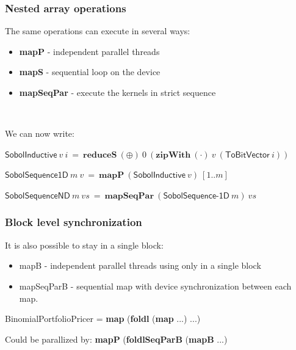 \documentclass{beamer}
\begin{document}

\begin{frame}
  \frametitle{Nested array operations}

  The same operations can execute in several ways:

  \begin{itemize}
  \item \textbf{mapP} - independent parallel threads
  \item \textbf{mapS} - sequential loop on the device
  \item \textbf{mapSeqPar} - execute the kernels in strict sequence
  \end{itemize}
  ~\vspace{2mm}\pause

  We can now write:
  ~\vspace{2mm}

  \hspace{1mm}$\mathsf{SobolInductive}~v~i~=~\textbf{reduceS}~(\oplus)~0~(\textbf{zipWith}~(\cdot)~v~(\textsf{ToBitVector}~i))$
  ~\vspace{2mm}\pause
  
  \hspace{1mm}$\mathsf{SobolSequence1D}~m~v~=~\textbf{mapP}~(\textsf{SobolInductive}~v)~[1..m]$
  ~\vspace{2mm}\pause

  \hspace{1mm}$\mathsf{SobolSequenceND}~m~vs~=~\textbf{mapSeqPar}~(\textsf{SobolSequence-1D}~m)~vs$

\end{frame}



\begin{frame}
  \frametitle{Block level synchronization}

  It is also possible to stay in a single block:

  \begin{itemize}
  \item mapB - independent parallel threads using only in a single block
  \item mapSeqParB - sequential map with device synchronization between each map.
  \end{itemize}


  BinomialPortfolioPricer = \textbf{map} (\textbf{foldl} (\textbf{map} ...) ...)

  Could be parallized by: \textbf{mapP} (\textbf{foldlSeqParB} (\textbf{mapB} ...)
\end{frame}
\end{document}
